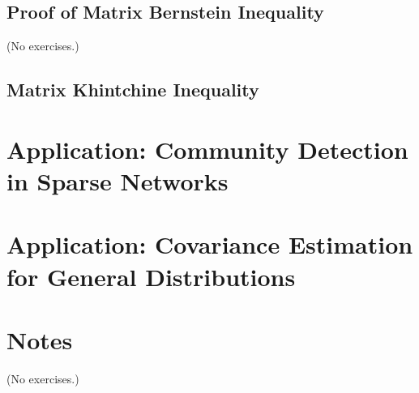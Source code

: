 \documentclass{report}
\theoremstyle{definition}
\newenvironment{exercise}[1]{
  \renewcommand\theexerciseimpl{#1}
  \exerciseimpl
}{\endexerciseimpl}
\begin{document}
\subsection{Proof of Matrix Bernstein Inequality}

(No exercises.)

\subsection{Matrix Khintchine Inequality}

\begin{exercise}{5.4.11}
\end{exercise}

\begin{exercise}{5.4.12}
\end{exercise}

\begin{exercise}{5.4.13}
\end{exercise}

\begin{exercise}{5.4.14}
\end{exercise}

\begin{exercise}{5.4.15}
\end{exercise}

\section{Application: Community Detection in Sparse Networks}

\begin{exercise}{5.5.1}
\end{exercise}

\begin{exercise}{5.5.2}
\end{exercise}

\section{Application: Covariance Estimation for General Distributions}

\begin{exercise}{5.6.4}
\end{exercise}

\begin{exercise}{5.6.5}
\end{exercise}

\begin{exercise}{5.6.6}
\end{exercise}

\begin{exercise}{5.6.7}
\end{exercise}

\begin{exercise}{5.6.8}
\end{exercise}

\section{Notes}

(No exercises.)
\end{document}
